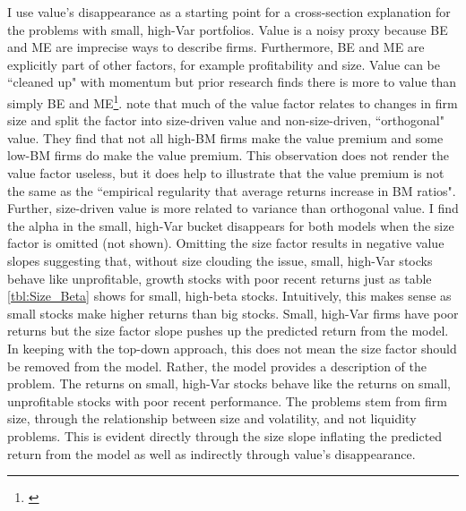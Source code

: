 I use value's disappearance as a starting point for a cross-section
explanation for the problems with small, high-Var portfolios.
Value is a noisy proxy because BE and ME are imprecise ways to describe firms.
Furthermore, BE and ME are explicitly part of other factors, for example
profitability and size.
Value can be ``cleaned up" with momentum but prior research finds there is more
to value than simply BE and ME\footnote{
\textcite{cohen2003value, daniel2006market, fama2008average}}.
\textcite{gerakos2017decomposing} note that much of the value factor relates to
changes in firm size and split the factor into size-driven value and
non-size-driven, ``orthogonal" value.
They find that not all high-BM firms make the value premium and some low-BM
firms do make the value premium.
This observation does not render the value factor useless, but it does help to
illustrate that the value premium is not the same as the ``empirical regularity
that average returns increase in BM ratios".
Further, size-driven value is more related to variance than orthogonal value.
I find the alpha in the small, high-Var bucket disappears for both models
when the size factor is omitted (not shown).
Omitting the size factor results in negative value slopes suggesting that,
without size clouding the issue, small, high-Var stocks behave like
unprofitable, growth stocks with poor recent returns just as table
\ref{tbl:Size_Beta} shows for small, high-beta stocks.
Intuitively, this makes sense as small stocks make higher returns than big stocks.
Small, high-Var firms have poor returns but the size factor slope pushes up
the predicted return from the model.
In keeping with the top-down approach, this does not mean the size factor
should be removed from the model.
Rather, the model provides a description of the problem.
The returns on small, high-Var stocks behave like the returns on small,
unprofitable stocks with poor recent performance.
The problems stem from firm size, through the relationship between size and
volatility, and not liquidity problems.
This is evident directly through the size slope inflating the predicted return
from the model as well as indirectly through value's disappearance.
